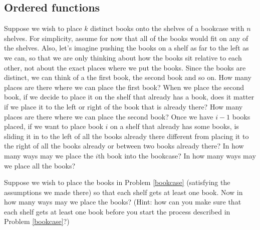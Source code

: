 \subsection{Ordered functions}
\bp 
\itemei Suppose we wish to place $k$ distinct books onto the shelves of
a bookcase with $n$ shelves.  For simplicity, assume for now that all of
the books would fit on any of the shelves.  Also, let's imagine pushing
the books on a shelf as far to the left as we can, so that we are only
thinking about how the books sit relative to each other, not about the
exact places where we put the books. Since the books are distinct, we can
think of a the first book, the second book and so on.  How many places
are there where we can place the first book?  When we place the second
book, if we decide to place it on the shelf that already has a book, does
it matter if we place it to the left or right of the book that is already
there?  How many places are there where we can place the second book? 
Once we have $i-1$ books placed, if we want to place  book $i$
on a shelf that already has some books, is sliding it in to the left of
all the books already there different from placing it to the right of
all the books already or between two books already there?  In how many
ways may we place the
$i$th book into the bookcase? In how many ways may we place all the
books?\label{bookcase}
\item Suppose we wish to place the books in Problem \ref{bookcase}
(satisfying the assumptions we made there) so that each shelf gets at
least one book.  Now in how many ways may we place the books? (Hint: how
can you make sure that each shelf gets at least one book before you start
the process described in Problem
\ref{bookcase}?)\label{bookcaseeveryshelf}
